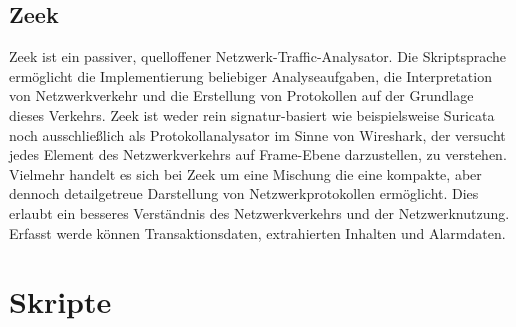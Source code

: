\subsection{Zeek}
Zeek ist ein passiver, quelloffener Netzwerk-Traffic-Analysator. Die Skriptsprache ermöglicht die Implementierung beliebiger Analyseaufgaben, die Interpretation von Netzwerkverkehr und die Erstellung von Protokollen auf der Grundlage dieses Verkehrs. Zeek ist weder rein signatur-basiert wie beispielsweise Suricata noch ausschließlich als Protokollanalysator im Sinne von Wireshark, der versucht jedes Element des Netzwerkverkehrs auf Frame-Ebene darzustellen, zu verstehen. Vielmehr handelt es sich bei Zeek um eine Mischung die eine kompakte, aber dennoch detailgetreue Darstellung von Netzwerkprotokollen ermöglicht. Dies erlaubt ein besseres Verständnis des Netzwerkverkehrs und der Netzwerknutzung. Erfasst werde können Transaktionsdaten, extrahierten Inhalten und Alarmdaten.
\section{Skripte}
